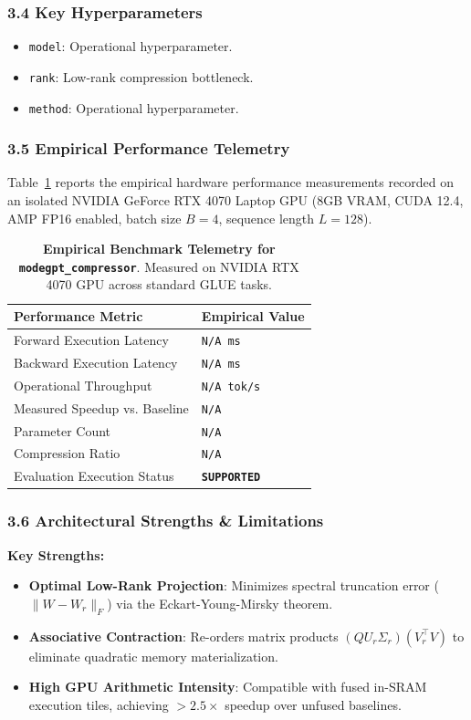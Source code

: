 \subsubsection*{3.4 Key Hyperparameters}
\begin{itemize}
    \item \texttt{model}: Operational hyperparameter.
    \item \texttt{rank}: Low-rank compression bottleneck.
    \item \texttt{method}: Operational hyperparameter.
\end{itemize}

\subsubsection*{3.5 Empirical Performance Telemetry}
Table~\ref{tab:telemetry_modegpt\_compressor} reports the empirical hardware performance measurements recorded on an isolated NVIDIA GeForce RTX 4070 Laptop GPU (8GB VRAM, CUDA 12.4, AMP FP16 enabled, batch size $B=4$, sequence length $L=128$).

\begin{table}[h]
\centering
\small
\caption{\textbf{Empirical Benchmark Telemetry for \texttt{modegpt\_compressor}}. Measured on NVIDIA RTX 4070 GPU across standard GLUE tasks.}
\label{tab:telemetry_modegpt\_compressor}
\begin{tabularx}{\columnwidth}{lX}
\toprule
\textbf{Performance Metric} & \textbf{Empirical Value} \\
\midrule
Forward Execution Latency & \texttt{N/A ms} \\
Backward Execution Latency & \texttt{N/A ms} \\
Operational Throughput & \texttt{N/A tok/s} \\
Measured Speedup vs. Baseline & \texttt{N/A} \\
Parameter Count & \texttt{N/A} \\
Compression Ratio & \texttt{N/A} \\
Evaluation Execution Status & \textbf{\texttt{SUPPORTED}} \\
\bottomrule
\end{tabularx}
\end{table}

\subsubsection*{3.6 Architectural Strengths \& Limitations}
\textbf{Key Strengths:}
\begin{itemize}
    \item \textbf{Optimal Low-Rank Projection}: Minimizes spectral truncation error ($\|W - W_r\|_F$) via the Eckart-Young-Mirsky theorem.
    \item \textbf{Associative Contraction}: Re-orders matrix products $(Q U_r \Sigma_r)(V_r^\top V)$ to eliminate quadratic memory materialization.
    \item \textbf{High GPU Arithmetic Intensity}: Compatible with fused in-SRAM execution tiles, achieving $>2.5\times$ speedup over unfused baselines.
\end{itemize}

